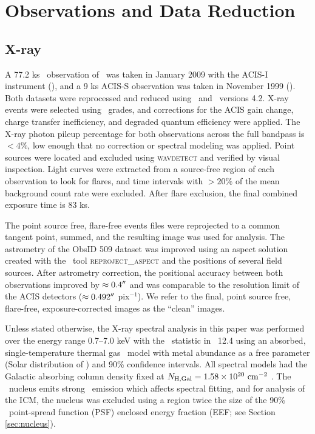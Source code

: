 \documentclass[useAMS,usenatbib]{mn2e}
\begin{document}
\section{Observations and Data Reduction}
\label{sec:obs}

\subsection{X-ray}
\label{sec:xray}

A 77.2 ks \cxo\ observation of \irs\ was taken in January 2009 with
the ACIS-I instrument (),
and a 9 ks ACIS-S observation was taken in November 1999
(). Both datasets were
reprocessed and reduced using \ciao\ and \caldb\ versions 4.2. X-ray
events were selected using \asca\ grades, and corrections for the ACIS
gain change, charge transfer inefficiency, and degraded quantum
efficiency were applied. The X-ray photon pileup percentage for both
observations across the full bandpass is $< 4\%$, low enough that no
correction or spectral modeling was applied. Point sources were
located and excluded using {\textsc{wavdetect}} and verified by visual
inspection. Light curves were extracted from a source-free region of
each observation to look for flares, and time intervals with $> 20\%$
of the mean background count rate were excluded. After flare
exclusion, the final combined exposure time is 83 ks.

The point source free, flare-free events files were reprojected to a
common tangent point, summed, and the resulting image was used for
analysis. The astrometry of the ObsID 509 dataset was improved using
an aspect solution created with the \ciao\ tool
{\textsc{reproject\_aspect}} and the positions of several field
sources. After astrometry correction, the positional accuracy between
both observations improved by $\approx 0.4\rm{^\prime}\hskip -0.1em\rm{^\prime}$ and was comparable to
the resolution limit of the ACIS detectors ($\approx 0.492\rm{^\prime}\hskip -0.1em\rm{^\prime}$
pix$^{-1}$). We refer to the final, point source free, flare-free,
exposure-corrected images as the ``clean'' images.

Unless stated otherwise, the X-ray spectral analysis in this paper was
performed over the energy range 0.7--7.0 keV with the
\chisq\ statistic in \xspec\ 12.4 \citep{xspec} using an absorbed,
single-temperature thermal gas \mekal\ model \citep{mekal1} with metal
abundance as a free parameter (Solar distribution of \citealt{ag89})
and 90\% confidence intervals. All spectral models had the Galactic
absorbing column density fixed at $N_{\rm{H,Gal}} = 1.58 \times 10^{20}
~\mbox{\ensuremath{\rm{cm^{-2}}}}$ \citep{lab}. The \irs\ nucleus emits strong \feka\ emission
which affects spectral fitting, and for analysis of the ICM, the
nucleus was excluded using a region twice the size of the 90\%
\cxo\ point-spread function (PSF) enclosed energy fraction (EEF; see
Section \ref{sec:nucleus}).
\end{document}
